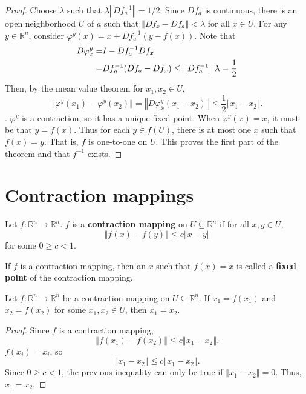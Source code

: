 \documentclass[compress]{beamer}
\def\R{\mathbb{R}}
\newcommand{\norm}[1]{\left\Vert {#1} \right\Vert}
\renewcommand{\to}{{\rightarrow}}
\begin{document}
\begin{frame}
  \begin{proof}
    Choose $\lambda$ such that $\lambda \norm{Df_a^{-1}} = 1/2$. Since
    $Df_a$ is continuous, there is an open neighborhood $U$ of $a$ such
    that $\norm{Df_x - Df_a} < \lambda$ for all $x \in U$. For any $y
    \in \R^n$, consider $\varphi^y(x) = x + Df_a^{-1} \left(y - f(x)
    \right)$. Note that 
    \begin{align}
      D \varphi^y_x = & I - Df_a^{-1} Df_x \notag \\ 
      = & Df_a^{-1} (Df_a - Df_x) \leq \norm{Df_a^{-1}} \lambda =
      \frac{1}{2} \label{e50}
    \end{align}
    Then, by the mean value theorem for $x_1, x_2 \in U$, 
    \[ \norm{\varphi^y(x_1) - \varphi^y(x_2)} = \norm{D\varphi^y_{\bar{x}}
      (x_1 - x_2) } \leq \frac{1}{2} \norm{x_1 - x_2}. \].
    $\varphi^y$ is a contraction, so it has a unique fixed point.
    When $\varphi^y(x) = x$, it must be that $y = f(x)$. Thus for each
    $y \in f(U)$, there is at most one $x$ such that $f(x) = y$. That
    is, $f$ is one-to-one on $U$. This proves the first part of the
    theorem and that $f^{-1}$ exists. 
  \end{proof}
\end{frame}

\section{Contraction mappings}

\begin{frame}
  \begin{definition}
    Let $f:\R^n \to \R^n$. $f$ is a \textbf{contraction mapping} on $U
    \subseteq \R^n$ if for all $x,y \in U$, 
    \[ \norm{f(x) - f(y)} \leq c \norm{x - y} \]
    for some $0 \geq c < 1$.
  \end{definition}
  If $f$ is a contraction mapping, then an $x$ such that $f(x) = x$ is
  called a \textbf{fixed point} of the contraction mapping.
\end{frame}

\begin{frame}
  \begin{lemma}
    Let $f:\R^n \to \R^n$ be a contraction mapping on $U \subseteq
    \R^n$. If $x_1 = f(x_1)$ and $x_2 = f(x_2)$ for some $x_1, x_2 \in
    U$, then $x_1 = x_2$.
  \end{lemma}
  \begin{proof}
    Since $f$ is a contraction mapping, 
    \[ \norm{f(x_1) - f(x_2)} \leq c \norm{x_1 - x_2}. \]
    $f(x_i) = x_i$, so
    \[ \norm{x_1 - x_2} \leq c \norm{x_1 - x_2}. \]
    Since $0 \geq c < 1$, the previous inequality can only be true if
    $\norm{x_1 - x_2} = 0$. Thus, $x_1 = x_2$.
  \end{proof}
\end{frame}
\end{document}
